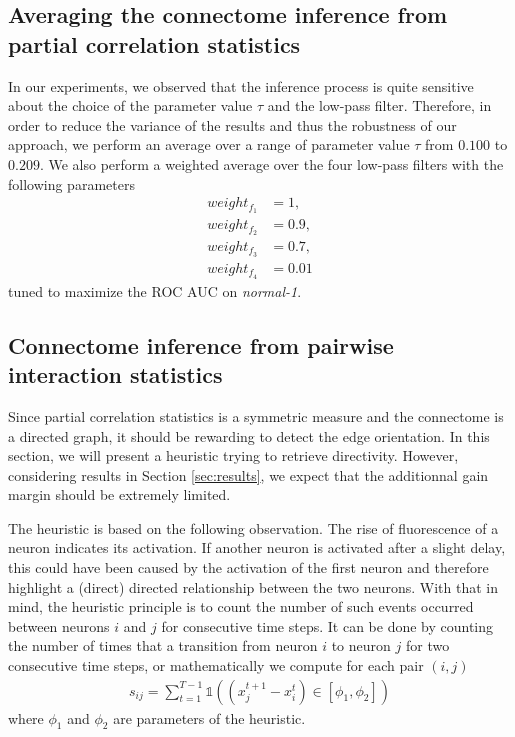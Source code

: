 \documentclass[wcp]{jmlr}
\begin{document}
\subsection*{Averaging the connectome inference from partial correlation statistics}

In our experiments, we observed that the inference process is quite sensitive
about the choice of the parameter value $\tau$ and the low-pass filter.
Therefore, in order to reduce the variance of the results and thus the
robustness of our approach, we perform an average over a range of parameter
value $\tau$ from $0.100$ to $0.209$. We also perform a weighted average over
the four low-pass filters with the following parameters
\begin{align*}
weight_{f_1} &= 1,\\
weight_{f_2} &= 0.9, \\
weight_{f_3} &= 0.7, \\
weight_{f_4} &= 0.01
\end{align*}
tuned to maximize the ROC AUC on \textit{normal-1}.

\subsection*{Connectome inference from pairwise interaction statistics}

Since partial correlation statistics is a symmetric measure and the connectome
is a directed graph, it should be rewarding to detect the edge orientation. In
this section, we will present a heuristic trying to retrieve directivity.
However, considering results in Section \ref{sec:results}, we expect that the
additionnal gain margin should be extremely limited.

The heuristic is based on the following observation. The rise of fluorescence
of a neuron indicates its activation. If another neuron is activated after a
slight delay, this could have been caused by the activation of the first
neuron and therefore highlight a (direct) directed relationship between the
two neurons. With that in mind, the heuristic principle is to count the number
of such events occurred between neurons $i$ and $j$ for consecutive time
steps. It can be done by counting the number of times that a transition from
neuron $i$ to neuron $j$ for two consecutive time steps, or mathematically we
compute for each pair $(i,j)$
\begin{align}
s_{ij} = \sum_{t=1}^{T - 1} \mathbb{1}((x_j^{t+1} - x_i^t) \in \left[\phi_1, \phi_2\right])
\end{align}
where $\phi_1$ and $\phi_2$ are parameters of the heuristic.
\end{document}
